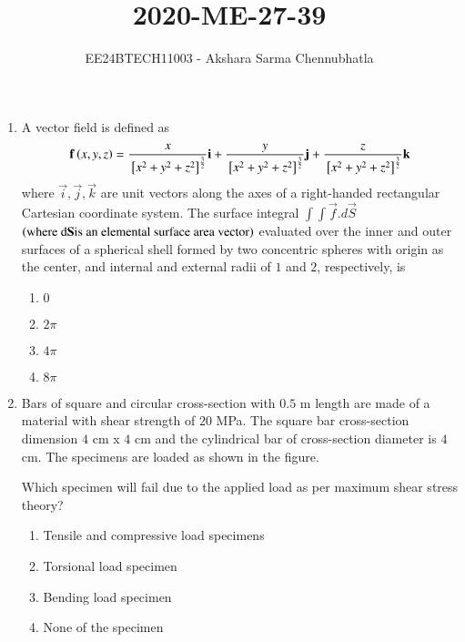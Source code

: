 \documentclass[journal,12pt,onecolumn]{IEEEtran}
\theoremstyle{remark}
\begin{document}

\title{2020-ME-27-39}
\author{EE24BTECH11003 - Akshara Sarma Chennubhatla}
\maketitle
\begin{enumerate}[start=27]

\item A vector field is defined as
\begin{align*}
\mathbf{f}\left(x,y,z\right) = \frac{x}{{}\left[x^2 + y^2 + z^2\right]^\frac{3}{2}}\mathbf{i} + \frac{y}{{}\left[x^2 + y^2 + z^2\right]^\frac{3}{2}}\mathbf{j} + \frac{z}{{}\left[x^2 + y^2 + z^2\right]^\frac{3}{2}}\mathbf{k}
\end{align*}
where $\vec{i}, \vec{j}, \vec{k}$ are unit vectors along the axes of a right-handed rectangular Cartesian coordinate system. The surface integral $\int\int \vec{f}.d\vec{S}$ $\left(\text{where d}\mathbf{S}\text{is an elemental surface area vector}\right)$ evaluated over the inner and outer surfaces of a spherical shell formed by two concentric spheres with origin as the center, and internal and external radii of $1$ and $2$, respectively, is
\hfill{}
\begin{enumerate}
\item $0$
\item $2\pi$
\item $4\pi$
\item $8\pi$
\end{enumerate}

\item Bars of square and circular cross-section with $0.5$ m length are made of a material with shear strength of $20$ MPa. The square bar cross-section dimension $4$ cm x $4$ cm and the cylindrical bar of cross-section diameter is $4$ cm. The specimens are loaded as shown in the figure.
\begin{center}

\end{center}
Which specimen will fail due to the applied load as per maximum shear stress theory?
\hfill{}
\begin{enumerate}
\item Tensile and compressive load specimens
\item Torsional load specimen
\item Bending load specimen
\item None of the specimen
\end{enumerate}


\end{enumerate}
\end{document}
